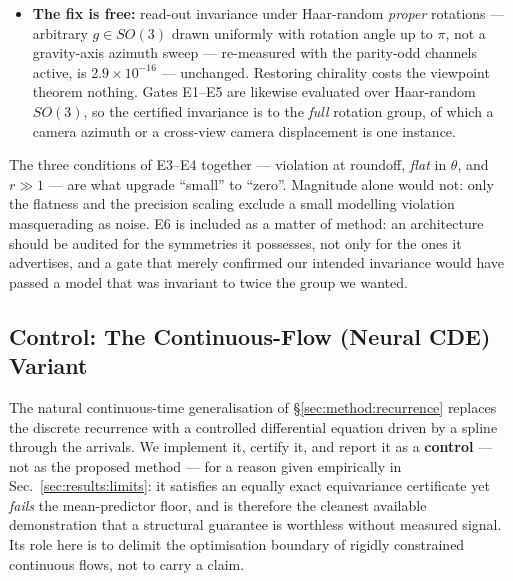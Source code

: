 \documentclass[10pt,journal]{IEEEtran}
\begin{document}
\begin{itemize}
reflection) moves the score by $4.5\times10^{-2}$ and $6.2\times10^{-2}$ for the two cuts
respectively. Both models separate a left-limb from a right-limb movement
(Remark~\ref{rem:laterality}).
\item[E8] \textbf{The fix is free:} read-out invariance under Haar-random \emph{proper} rotations
--- arbitrary $g\in SO(3)$ drawn uniformly with rotation angle up to $\pi$, not a gravity-axis
azimuth sweep --- re-measured with the parity-odd channels active, is $2.9\times10^{-16}$ ---
unchanged. Restoring chirality costs the viewpoint theorem nothing. Gates E1--E5 are likewise
evaluated over Haar-random $SO(3)$, so the certified invariance is to the \emph{full} rotation group,
of which a camera azimuth or a cross-view camera displacement is one instance.
\end{itemize}
%
The three conditions of E3--E4 together --- violation at roundoff, \emph{flat} in $\theta$, and
$r\gg1$ --- are what upgrade ``small'' to ``zero''. Magnitude alone would not: only the flatness and
the precision scaling exclude a small modelling violation masquerading as noise. E6 is included as a
matter of method: an architecture should be audited for the symmetries it possesses, not only for the
ones it advertises, and a gate that merely confirmed our intended invariance would have passed a model
that was invariant to twice the group we wanted.

\subsection{Control: The Continuous-Flow (Neural CDE) Variant}
\label{sec:method:cde-control}

The natural continuous-time generalisation of \S\ref{sec:method:recurrence} replaces the discrete
recurrence with a controlled differential equation driven by a spline through the arrivals. We
implement it, certify it, and report it as a \textbf{control} --- not as the proposed method --- for a
reason given empirically in Sec.~\ref{sec:results:limits}: it satisfies an equally exact equivariance
certificate yet \emph{fails} the mean-predictor floor, and is therefore the cleanest available
demonstration that a structural guarantee is worthless without measured signal. Its role here is to
delimit the optimisation boundary of rigidly constrained continuous flows, not to carry a claim.
\end{document}
